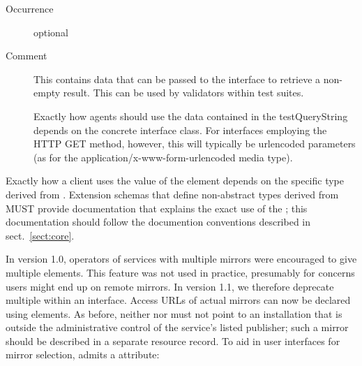 \documentclass[11pt,a4paper]{ivoa}
\begin{document}
\begin{generated}
\begin{bigdescription}
\begin{description}
\item[Occurrence] optional
\item[Comment] 
                  This contains data that can be passed to the interface to
                  retrieve a non-empty result.  This can be used by validators
                  within test suites.

                  Exactly how agents should use the data contained in
                  the testQueryString depends on the concrete interface class.
                  For interfaces employing the HTTP GET method, however,
                  this will typically be urlencoded parameters (as for
                  the application/x-www-form-urlencoded media type).
               

\end{description}


\end{bigdescription}\endgroup

\endgroup
\end{generated}



Exactly how a client uses the value
of the  element depends on the specific
type derived from .  Extension schemas that
define non-abstract types derived from  MUST
provide documentation that explains the exact use of the
; this documentation should follow the
documention conventions described in sect.~\ref{sect:core}.  

In version 1.0, operators of services with multiple mirrors were
encouraged to give multiple  elements.  This feature
was not used in practice, presumably for concerns users might end up on
remote mirrors.  In version 1.1, we therefore deprecate multiple
 within an interface.  Access URLs of actual mirrors
can now be declared using  elements.
As before, neither 
 nor  must not point to an installation
that is outside the administrative control of the service's listed
publisher; such a mirror should be described in a separate resource
record.  To aid in user interfaces for mirror selection,
 admits a  attribute:
\end{document}
